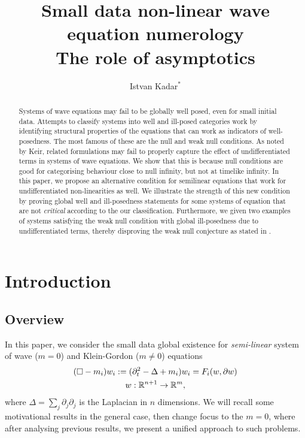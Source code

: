 \documentclass[11pt, oneside]{amsart}
\title[Small data non-linear wave equation numerology]{\large Small data non-linear wave equation numerology \\\small  The role of asymptotics}
\author{Istvan Kadar${}^{{*}}$}
\begin{document}
	\maketitle
	\setcounter{tocdepth}{1}
	\begin{abstract}
		Systems of wave equations may fail to be globally well posed, even for small initial data. Attempts to classify systems into well and ill-posed categories work by identifying structural properties of the equations that can work as indicators of well-posedness. The most famous of these are the null and weak null conditions. As noted by Keir,  related formulations may fail to properly capture the effect of undifferentiated terms in systems of wave equations. We show that this is because null conditions are good for categorising behaviour close to null infinity, but not at timelike infinity. In this paper, we propose an alternative condition for semilinear equations that work for undifferentiated non-linearities as well. We illustrate the strength of this new condition by proving global well and ill-posedness statements for some systems of equation that are not \textit{critical} according to the our classification. Furthermore, we given two examples of systems satisfying the weak null condition with global ill-posedness due to undifferentiated terms, thereby disproving the weak null conjecture as stated in \cite{deng_global_2018}.
		
	\end{abstract}
	\tableofcontents
	\section{Introduction}
	\subsection{Overview}
	In this paper, we consider the small data global existence for \textit{semi-linear} system of wave ($m=0$) and Klein-Gordon ($m\neq0$) equations
	\begin{equation}\label{generic model}
		\begin{gathered}
			(\Box-m_i)w_i:=(\partial_t^2-\Delta+m_i)w_i=F_i(w,\partial w)\\
			w:\mathbb{R}^{n+1}\to\mathbb{R}^m,
		\end{gathered}
	\end{equation}
	where $\Delta=\sum_j\partial_j\partial_j$ is the Laplacian in $n$ dimensions. We will recall some motivational results in the general case, then change focus to the $m=0$, where after analysing previous results, we present a unified approach to such problems.
	
\end{document}

